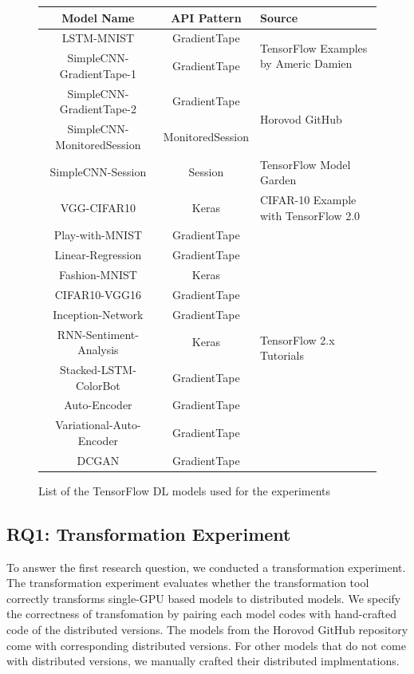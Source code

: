 \pagebreak
\begin{figure}[!ht]
  \begin{center}
  \begin{tabular}{c|c|l}
    \hline
    Model Name & API Pattern & Source \\
    \hline
    LSTM-MNIST & GradientTape & \multirow{2}{*}{TensorFlow Examples by Americ Damien\cite{tfexamplesdamien}} \\
    SimpleCNN-GradientTape-1 & GradientTape \\
    \hline
    SimpleCNN-GradientTape-2 & GradientTape & \multirow{2}{*}{Horovod GitHub\cite{horovodgithub}} \\
    SimpleCNN-MonitoredSession & MonitoredSession  \\
    \hline
    SimpleCNN-Session & Session & TensorFlow Model Garden\cite{tfmodelgarden} \\
    \hline
    VGG-CIFAR10 & Keras & CIFAR-10 Example with TensorFlow 2.0\cite{cifar10github} \\
    \hline
    Play-with-MNIST & GradientTape & \multirow{10}{*}{TensorFlow 2.x Tutorials\cite{tf2tutogithub}} \\
    Linear-Regression & GradientTape  \\
    Fashion-MNIST & Keras  \\
    CIFAR10-VGG16 & GradientTape \\
    Inception-Network & GradientTape  \\
    RNN-Sentiment-Analysis & Keras  \\
    Stacked-LSTM-ColorBot & GradientTape  \\
    Auto-Encoder & GradientTape  \\
    Variational-Auto-Encoder & GradientTape  \\
    DCGAN & GradientTape  \\
    \hline
  \end{tabular}
  \end{center}
  \caption{List of the TensorFlow DL models used for the experiments}
  \label{fig:eval:targets}
\end{figure}


\subsection{RQ1: Transformation Experiment}

To answer the first research question,
we conducted a transformation experiment.
The transformation experiment evaluates whether the transformation tool
correctly transforms single-GPU based models to distributed models.
We specify the correctness of transfomation by pairing each model codes 
with hand-crafted code of the distributed versions. 
The models from the Horovod GitHub repository\cite{horovodgithub}
come with corresponding distributed versions.
For other models that do not come with distributed versions,
we manually crafted their distributed implmentations.


